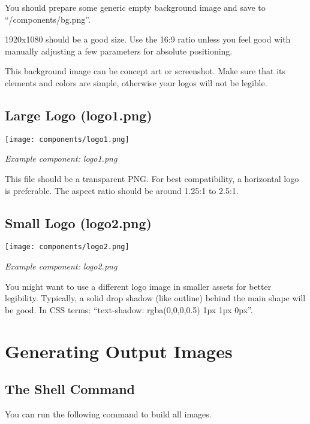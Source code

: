 \documentclass[11pt,a4paper]{report}
\begin{document}
You should prepare some generic empty background image and save to ``/components/bg.png''.

1920x1080 should be a good size.
Use the 16:9 ratio unless you feel good with manually adjusting a few parameters for absolute positioning.

This background image can be concept art or screenshot.
Make sure that its elements and colors are simple, otherwise your logos will not be legible.

\section{Large Logo (logo1.png)}
\begin{minipage}{\linewidth}
	\center\sffamily
	\colorbox{white!75!gray}{\texttt{[image: components/logo1.png]}}\par
	\small\itshape
	Example component: logo1.png
\end{minipage}


This file should be a transparent PNG.
For best compatibility, a horizontal logo is preferable.
The aspect ratio should be around 1.25:1 to 2.5:1.

\section{Small Logo (logo2.png)}
\begin{minipage}{\linewidth}
	\center\sffamily
	\colorbox{white!75!gray}{\texttt{[image: components/logo2.png]}}\par
	\small\itshape
	Example component: logo2.png
\end{minipage}

You might want to use a different logo image in smaller assets for better legibility.
Typically, a solid drop shadow (like outline) behind the main shape will be good.
In CSS terms: ``text-shadow: rgba(0,0,0,0.5) 1px 1px 0px''.





\chapter{Generating Output Images}

\section{The Shell Command}
You can run the following command to build all images.
\end{document}
